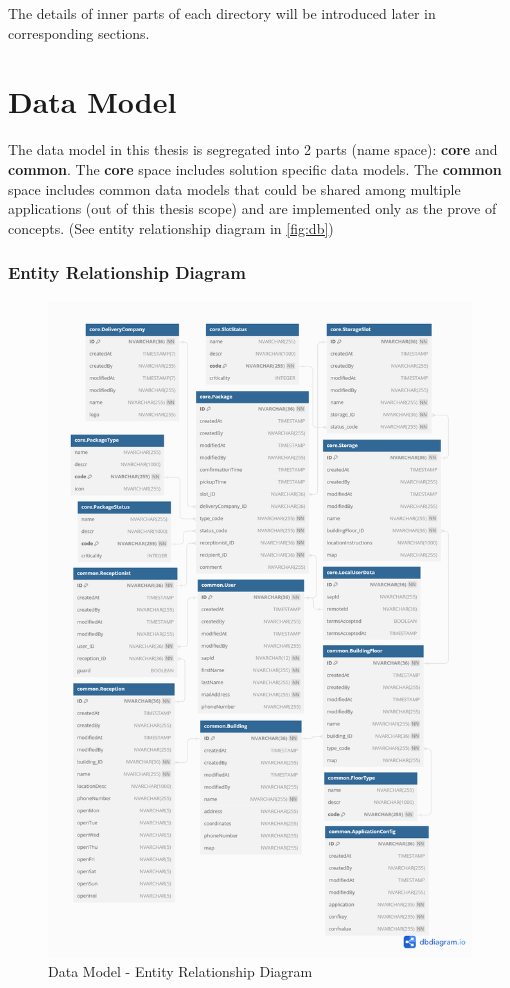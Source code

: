 The details of inner parts of each directory will be introduced later in corresponding sections.

\section{Data Model}
\label{sec:D-db}

The data model in this thesis is segregated into 2 parts (name space): \textbf{core} and \textbf{common}. 
The \textbf{core} space includes solution specific data models. The \textbf{common} space includes common data models that could be shared among multiple applications (out of this thesis scope) and are implemented only as the prove of concepts. (See entity relationship diagram in \autoref{fig:db})

\subsubsection{Entity Relationship Diagram}
\begin{figure}[H]
	\centering
	\includegraphics[width=1\linewidth]{images/DB/DB_Relationship.png}
	\caption{Data Model - Entity Relationship Diagram}
	\label{fig:db}
\end{figure}

